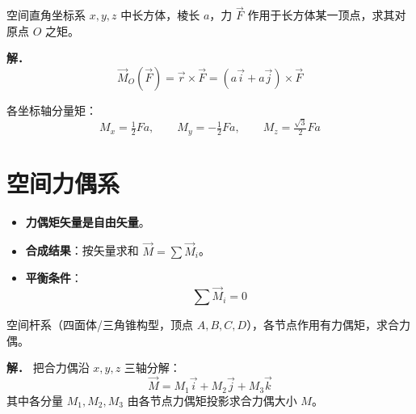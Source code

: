 \begin{example}[力对点的矩]
空间直角坐标系 $x,y,z$ 中长方体，棱长 $a$，力 $\vec{F}$ 作用于长方体某一顶点，求其对原点 $O$ 之矩。

\textbf{解．}
\begin{equation}
\vec{M}_O(\vec{F})=\vec{r}\times\vec{F}=(a\vec{i}+a\vec{j})\times\vec{F}
\label{eq:3-力矩-例-首步}
\end{equation}

各坐标轴分量矩：
\begin{equation}
M_x=\tfrac{1}{2}Fa,\qquad M_y=-\tfrac{1}{2}Fa,\qquad M_z=\tfrac{\sqrt{3}}{2}Fa
\label{eq:3-力矩-例-分量}
\end{equation}
\end{example}

\section{空间力偶系}

\begin{itemize}
\item \textbf{力偶矩矢量是自由矢量}。
\item \textbf{合成结果}：按矢量求和 $\vec{M}=\sum\vec{M}_i$。
\item \textbf{平衡条件}：
\begin{equation}
\boxed{\;\sum\vec{M}_i=0\;}
\label{eq:3-力偶-平衡}
\end{equation}
\end{itemize}

\begin{example}[求合力偶]
空间杆系（四面体/三角锥构型，顶点 $A,B,C,D$），各节点作用有力偶矩，求合力偶。

\textbf{解．} 把合力偶沿 $x,y,z$ 三轴分解：
\begin{equation}
\vec{M}=M_1\vec{i}+M_2\vec{j}+M_3\vec{k}
\label{eq:3-力偶-例-分解}
\end{equation}
其中各分量 $M_1,M_2,M_3$ 由各节点力偶矩投影求合力偶大小 $M$。
\end{example}

